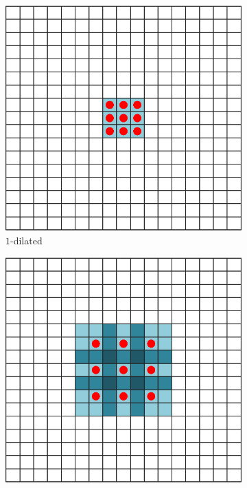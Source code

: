 \begin{figure}[!hbt]
	\hfill
	\begin{subfigure}{0.30\linewidth}
		\includegraphics[width=\linewidth]{Figures/Segmentation/dilated_conv1_rework.eps}
		\caption{$1$-dilated}
		\label{fig:dilated-convolution:1}
	\end{subfigure}
	\hfill
	\begin{subfigure}{0.30\linewidth}
		\includegraphics[width=\linewidth]{Figures/Segmentation/dilated_conv2_rework.eps}

\end{subfigure}
\end{figure}
